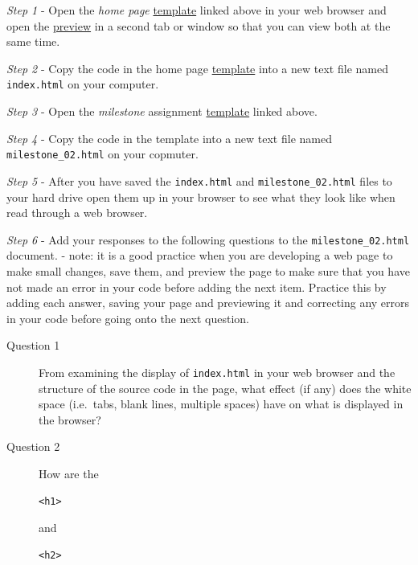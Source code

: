 \documentclass[]{book}
\begin{document}
\emph{Step 1} - Open the \emph{home page}
\href{https://github.com/UNM-GEOG-485-585/class-materials/blob/master/sample-files/homePageTemplate.html}{template}
linked above in your web browser and open the
\href{http://htmlpreview.github.io/?https://github.com/UNM-GEOG-485-585/class-materials/blob/master/sample-files/homePageTemplate.html}{preview}
in a second tab or window so that you can view both at the same time.

\emph{Step 2} - Copy the code in the home page
\href{https://github.com/UNM-GEOG-485-585/class-materials/blob/master/sample-files/homePageTemplate.html}{template}
into a new text file named \texttt{index.html} on your computer.

\emph{Step 3} - Open the \emph{milestone} assignment
\href{https://github.com/UNM-GEOG-485-585/class-materials/blob/master/sample-files/assignmentTemplate.html}{template}
linked above.

\emph{Step 4} - Copy the code in the template into a new text file named
\texttt{milestone\_02.html} on your copmuter.

\emph{Step 5} - After you have saved the \texttt{index.html} and
\texttt{milestone\_02.html} files to your hard drive open them up in
your browser to see what they look like when read through a web browser.

\emph{Step 6} - Add your responses to the following questions to the
\texttt{milestone\_02.html} document. - note: it is a good practice when
you are developing a web page to make small changes, save them, and
preview the page to make sure that you have not made an error in your
code before adding the next item. Practice this by adding each answer,
saving your page and previewing it and correcting any errors in your
code before going onto the next question.

\begin{description}
\item[Question 1]
From examining the display of \texttt{index.html} in your web browser
and the structure of the source code in the page, what effect (if any)
does the white space (i.e.~tabs, blank lines, multiple spaces) have on
what is displayed in the browser?
\item[Question 2]
How are the

\begin{verbatim}
<h1>
\end{verbatim}

and

\begin{verbatim}
<h2>
\end{verbatim}
\end{description}
\end{document}
